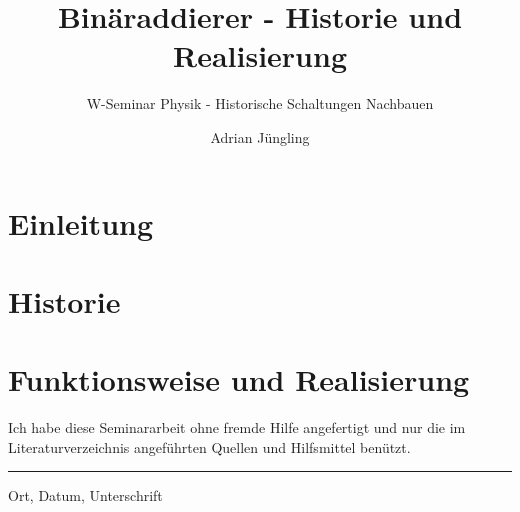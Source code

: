 \documentclass[parskip = half*,numbers=noenddot,12pt]{scrartcl}
\title{Binäraddierer - Historie und Realisierung}
\subtitle{W-Seminar Physik - Historische Schaltungen Nachbauen}
\author{Adrian Jüngling}
\begin{document}
	
			
	\maketitle
	\newpage
	\thispagestyle{empty}
	\tableofcontents
	\newpage
	
	\section{Einleitung}
	
	
	\section{Historie}
	
	
	\section{Funktionsweise und Realisierung}
	
	
	\newpage
	
	\newpage
	\listoffigures
	\newpage
	\vspace{3cm}
	\begin{center}
		Ich habe diese Seminararbeit ohne fremde Hilfe angefertigt und nur die im Literaturverzeichnis angeführten Quellen und Hilfsmittel benützt.
	\end{center}
	\vspace{5cm}
	\rule{\textwidth}{.4pt}
	\begin{tiny}
		Ort, Datum, Unterschrift
	\end{tiny}
\end{document}
